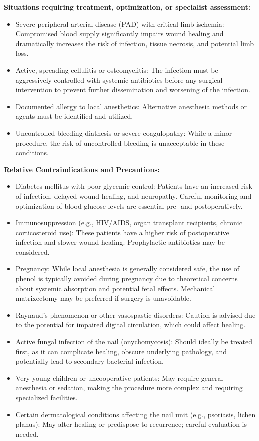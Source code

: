 \textbf{Situations requiring treatment, optimization, or specialist assessment:}
\begin{itemize}
  \item Severe peripheral arterial disease (PAD) with critical limb ischemia: Compromised blood supply significantly impairs wound healing and dramatically increases the risk of infection, tissue necrosis, and potential limb loss.
  \item Active, spreading cellulitis or osteomyelitis: The infection must be aggressively controlled with systemic antibiotics before any surgical intervention to prevent further dissemination and worsening of the infection.
  \item Documented allergy to local anesthetics: Alternative anesthesia methods or agents must be identified and utilized.
  \item Uncontrolled bleeding diathesis or severe coagulopathy: While a minor procedure, the risk of uncontrolled bleeding is unacceptable in these conditions.
\end{itemize}

\textbf{Relative Contraindications and Precautions:}
\begin{itemize}
  \item Diabetes mellitus with poor glycemic control: Patients have an increased risk of infection, delayed wound healing, and neuropathy. Careful monitoring and optimization of blood glucose levels are essential pre- and postoperatively.
  \item Immunosuppression (e.g., HIV/AIDS, organ transplant recipients, chronic corticosteroid use): These patients have a higher risk of postoperative infection and slower wound healing. Prophylactic antibiotics may be considered.
  \item Pregnancy: While local anesthesia is generally considered safe, the use of phenol is typically avoided during pregnancy due to theoretical concerns about systemic absorption and potential fetal effects. Mechanical matrixectomy may be preferred if surgery is unavoidable.
  \item Raynaud's phenomenon or other vasospastic disorders: Caution is advised due to the potential for impaired digital circulation, which could affect healing.
  \item Active fungal infection of the nail (onychomycosis): Should ideally be treated first, as it can complicate healing, obscure underlying pathology, and potentially lead to secondary bacterial infection.
  \item Very young children or uncooperative patients: May require general anesthesia or sedation, making the procedure more complex and requiring specialized facilities.
  \item Certain dermatological conditions affecting the nail unit (e.g., psoriasis, lichen planus): May alter healing or predispose to recurrence; careful evaluation is needed.
\end{itemize}

